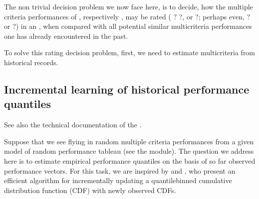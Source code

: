 \documentclass[a4paper,12pt,english]{sphinxhowto}
\begin{document}
The non trivial decision problem we now face here, is to decide, how the multiple criteria performances of , respectively ,  may be rated ( ?  ?, or  ?; perhaps even,  ? or  ?) in an , when compared with all potential similar multi\sphinxhyphen{}criteria performances one has already encountered in the past.

To solve this  rating decision problem, first, we need to estimate multi\sphinxhyphen{}criteria  from historical records.


\subsection{Incremental learning of historical performance quantiles}
\label{\detokenize{tutorial:incremental-learning-of-historical-performance-quantiles}}
See also the technical documentation of the .

Suppose that we see flying in random multiple criteria performances from a given model of random performance tableau (see the  module). The question we address here is to estimate empirical performance quantiles on the basis of so far observed performance vectors. For this task, we are inspired by  and , who present an efficient algorithm for incrementally updating a quantile\sphinxhyphen{}binned cumulative distribution function (CDF) with newly observed CDFs.
\end{document}
